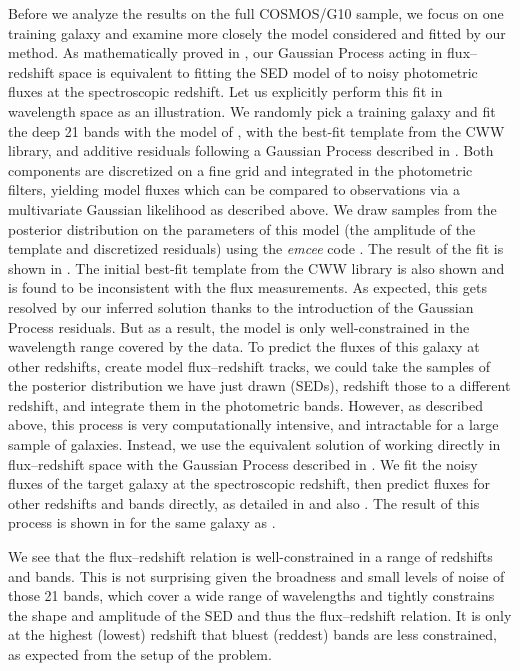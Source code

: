 \documentclass[aps,prd,showpacs,superscriptaddress,groupedaddress]{revtex4}  %
\begin{document}
Before we analyze the results on the full COSMOS/G10 sample, we focus on one training galaxy and examine more closely the model considered and fitted by our method.
As mathematically proved in , our Gaussian Process acting in flux--redshift space is equivalent to fitting the SED model of  to noisy photometric fluxes at the spectroscopic redshift.
Let us explicitly perform this fit in wavelength space as an illustration.
We randomly pick a training galaxy and fit the deep 21 bands with the model of , \ie with the best-fit template from the CWW library, and additive residuals following a Gaussian Process described in .
Both components are discretized on a fine grid and integrated in the photometric filters, yielding model fluxes which can be compared to observations via a multivariate Gaussian likelihood as described above. 
We draw samples from the posterior distribution on the parameters of this model (the amplitude of the template and discretized residuals) using the \textit{emcee} code \citep{emcee:2013}.
The result of the fit is shown in . 
The initial best-fit template from the CWW library is also shown and is found to be inconsistent with the flux measurements.
As expected, this gets resolved by our inferred solution thanks to the introduction of the Gaussian Process residuals.
But as a result, the model is only well-constrained in the wavelength range covered by the data. 
To predict the fluxes of this galaxy at other redshifts, \ie create model flux--redshift tracks, we could take the samples of the posterior distribution we have just drawn (SEDs), redshift those to a different redshift, and integrate them in the photometric bands.
However, as described above, this process is very computationally intensive, and intractable for a large sample of galaxies. 
Instead, we use the equivalent solution of working directly in flux--redshift space with the Gaussian Process described in .
We fit the noisy fluxes of the target galaxy at the spectroscopic redshift, then predict fluxes for other redshifts and bands directly, as detailed in  and also .
The result of this process is shown in  for the same galaxy as .

We see that the flux--redshift relation is well-constrained in a range of redshifts and bands. 
This is not surprising given the broadness and small levels of noise of those 21 bands, which cover a wide range of wavelengths and tightly constrains the shape and amplitude of the SED and thus the flux--redshift relation.
It is only at the highest (lowest) redshift that bluest (reddest) bands are less constrained, as expected from the setup of the problem.
\end{document}
